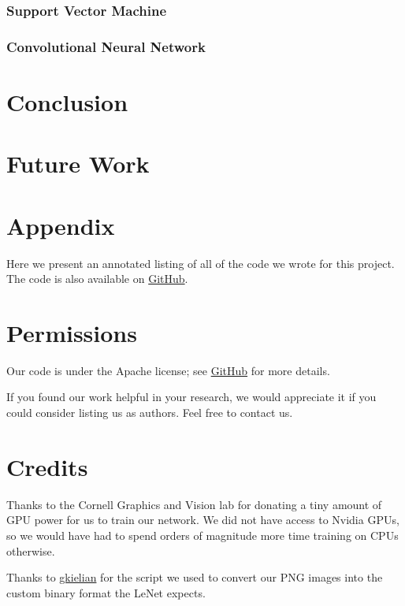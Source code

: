 \documentclass[leqno]{article}
\begin{document}
\subsubsection{Support Vector Machine}
\subsubsection{Convolutional Neural Network}

\section{Conclusion}

\section{Future Work}

\section{Appendix}
Here we present an annotated listing of all of the code we wrote for this
project. The code is also available on \href{http://github.com/darylsew/potato}{GitHub}.

\section{Permissions}
Our code is under the Apache license; see
\href{http://github.com/darylsew/potato}{GitHub} for more details.

If you found our work helpful in your research, we would appreciate it if you could consider
listing us as authors. Feel free to contact us.

\section{Credits}
Thanks to the Cornell Graphics and Vision lab for donating a tiny amount of GPU
power for us to train our network. We did not have access to Nvidia GPUs, so we
would have had to spend orders of magnitude more time training on CPUs
otherwise.

Thanks to
\href{https://github.com/gskielian/JPG-PNG-to-MNIST-NN-Format/blob/master/LICENSE}{gkielian}
for the script we used to convert our PNG images into the custom binary format
the LeNet expects.
\end{document}
